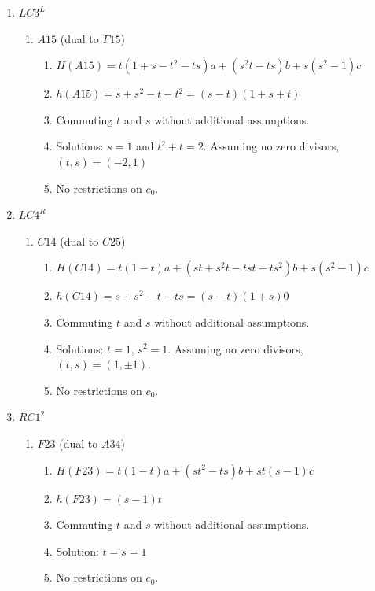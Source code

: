 \documentclass[11pt]{amsart}
\theoremstyle{definition}
\begin{document}
\begin{enumerate}
        \item[(15)] $LC3^L$
        \begin{enumerate}
            \item $A15$ (dual to $F15$)
            \begin{enumerate}
                \item $H(A15) = t(1+s-t^2-ts)a+(s^2t-ts)b+s(s^2-1)c$
                \item $h(A15) = s+s^2-t-t^2=(s-t)(1+s+t) $
                \item Commuting $t$ and $s$ without additional assumptions.
                \item Solutions: $s=1$ and $t^2+t = 2$. Assuming no zero divisors, $(t,s) = (-2,1)$
                \item No restrictions on $c_0$.
            \end{enumerate}
        \end{enumerate}

        \item[(16)] $LC4^R$
        \begin{enumerate}
            \item $C14$ (dual to $C25$)
            \begin{enumerate}
                \item $H(C14) = t(1-t)a+(st+s^2t-tst-ts^2)b+s(s^2-1)c$
                \item $h(C14) = s+s^2-t-ts = (s-t)(1+s)0$
                \item Commuting $t$ and $s$ without additional assumptions.
                \item Solutions: $t=1$, $s^2 = 1$. Assuming no zero divisors, $(t,s) = ( 1, \pm 1)$.
                \item No restrictions on $c_0$.
            \end{enumerate}
        \end{enumerate}

        \item[(17)] $RC1^2$
        \begin{enumerate}
            \item $F23$ (dual to $A34$)
            \begin{enumerate}
                \item $H(F23) = t(1-t)a+(st^2-ts)b+st(s-1)c$
                \item $h(F23) = (s-1)t$
                \item Commuting $t$ and $s$ without additional assumptions.
                \item Solution: $t=s=1$ 
                \item No restrictions on $c_0$.
            \end{enumerate}
        \end{enumerate}



\end{enumerate}
\end{document}
